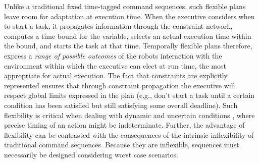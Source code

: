 Unlike a traditional fixed time-tagged command sequences, such
flexible plans leave room for adaptation at execution time. When the
executive considers when to start a task, it propagates information
through the constraint network, computes a time bound for the
variable, selects an actual execution time within the bound, and
starts the task at that time. Temporally flexible plans therefore,
express a \textit{range of possible outcomes} of the robots
interaction with the environment within which the executive can elect
at run time, the most appropriate for actual execution. The fact that
constraints are explicitly represented ensures that through constraint
propagation the executive will respect global limits expressed in the
plan (e.g., don't start a task until a certain condition has been
satisfied but still satisfying some overall deadline). Such
flexibility is critical when dealing with dynamic and uncertain
conditions ,
where precise timing of an action might be indeterminate. Further, the
advantage of flexibility can be contrasted with the consequences of
the intrinsic inflexibility of traditional command sequences. Because
they are inflexible, sequences 
must necessarily be designed considering worst case scenarios.

